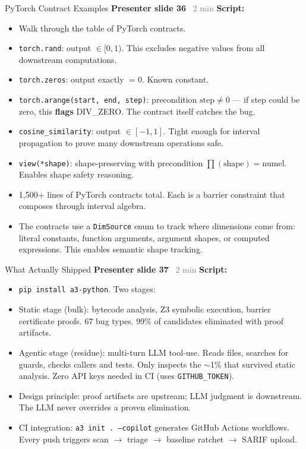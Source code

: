 \documentclass[aspectratio=169]{beamer}
\newcommand{\syncline}[2]{\textbf{#1} \hfill \textcolor{gray}{#2}}
\begin{document}
\begin{frame}{PyTorch Contract Examples}
\syncline{Presenter slide 36}{~2 min}
\textbf{Script:}
\begin{itemize}
  \item Walk through the table of PyTorch contracts.
  \item \texttt{torch.rand}: output $\in [0, 1)$. This excludes negative values from all downstream computations.
  \item \texttt{torch.zeros}: output exactly $= 0$. Known constant.
  \item \texttt{torch.arange(start, end, step)}: precondition $\text{step} \neq 0$ --- if step could be zero, this \textbf{flags} DIV\_ZERO. The contract itself catches the bug.
  \item \texttt{cosine\_similarity}: output $\in [-1, 1]$. Tight enough for interval propagation to prove many downstream operations safe.
  \item \texttt{view(*shape)}: shape-preserving with precondition $\prod(\text{shape}) = \text{numel}$. Enables shape safety reasoning.
  \item 1,500+ lines of PyTorch contracts total. Each is a barrier constraint that composes through interval algebra.
  \item The contracts use a \texttt{DimSource} enum to track where dimensions come from: literal constants, function arguments, argument shapes, or computed expressions. This enables semantic shape tracking.
\end{itemize}
\end{frame}


\begin{frame}{What Actually Shipped}
\syncline{Presenter slide 37}{~2 min}
\textbf{Script:}
\begin{itemize}
  \item \texttt{pip install a3-python}. Two stages:
  \item Static stage (bulk): bytecode analysis, Z3 symbolic execution, barrier certificate proofs. 67 bug types. 99\% of candidates eliminated with proof artifacts.
  \item Agentic stage (residue): multi-turn LLM tool-use. Reads files, searches for guards, checks callers and tests. Only inspects the $\sim$1\% that survived static analysis. Zero API keys needed in CI (uses \texttt{GITHUB\_TOKEN}).
  \item Design principle: proof artifacts are upstream; LLM judgment is downstream. The LLM never overrides a proven elimination.
  \item CI integration: \texttt{a3 init . --copilot} generates GitHub Actions workflows. Every push triggers scan $\to$ triage $\to$ baseline ratchet $\to$ SARIF upload.
\end{itemize}
\end{frame}
\end{document}

